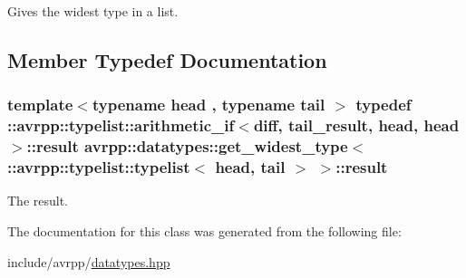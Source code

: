 Gives the widest type in a list. 

\subsection{Member Typedef Documentation}
\hypertarget{classavrpp_1_1datatypes_1_1get__widest__type_3_01_1_1avrpp_1_1typelist_1_1typelist_3_01head_00_01tail_01_4_01_4_a5708e104ae249b01ecdbe071cf8ec231}{
\subsubsection[{result}]{\setlength{\rightskip}{0pt plus 5cm}template$<$typename head , typename tail $>$ typedef ::{\bf avrpp::typelist::arithmetic\_\-if}$<$diff, tail\_\-result, head, head$>$::{\bf result} avrpp::datatypes::get\_\-widest\_\-type$<$ ::{\bf avrpp::typelist::typelist}$<$ head, tail $>$ $>$::{\bf result}}}
\label{classavrpp_1_1datatypes_1_1get__widest__type_3_01_1_1avrpp_1_1typelist_1_1typelist_3_01head_00_01tail_01_4_01_4_a5708e104ae249b01ecdbe071cf8ec231}


The result. 



The documentation for this class was generated from the following file:\begin{DoxyCompactItemize}
\item 
include/avrpp/\hyperlink{datatypes_8hpp}{datatypes.hpp}\end{DoxyCompactItemize}
